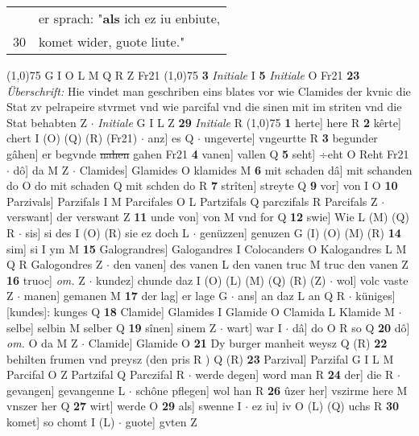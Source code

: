 \documentclass[8pt,a4paper,notitlepage]{article}
\begin{document}
\begin{table}[ht]
\begin{minipage}[t]{0.5\linewidth}
\begin{tabular}{rl}
 & er sprach: "\textbf{als} ich ez iu enbiute,\\ 
30 & komet wider, guote liute."\\ 
\end{tabular}
\scriptsize
\line(1,0){75} \newline
G I O L M Q R Z Fr21 \newline
\line(1,0){75} \newline
\textbf{3} \textit{Initiale} I  \textbf{5} \textit{Initiale} O Fr21  \textbf{23} \textit{Überschrift:} Hie vindet man geschriben eins blates vor wie Clamides der kvnic die Stat zv pelrapeire stvrmet vnd wie parcifal vnd die sinen mit im striten vnd die Stat behabten Z   $\cdot$ \textit{Initiale} G I L Z  \textbf{29} \textit{Initiale} R  \newline
\line(1,0){75} \newline
\textbf{1} herte] here R \textbf{2} kêrte] chert I (O) (Q) (R) (Fr21)  $\cdot$ anz] es Q  $\cdot$ ungeverte] vngeurtte R \textbf{3} begunder gâhen] er begvnde \sout{nahen} gahen Fr21 \textbf{4} vanen] vallen Q \textbf{5} seht] ÷eht O Reht Fr21  $\cdot$ dô] da M Z  $\cdot$ Clamides] Glamides O klamides M \textbf{6} mit schaden dâ] mit schanden do O do mit schaden Q mit schden do R \textbf{7} strîten] streyte Q \textbf{9} vor] von I O \textbf{10} Parzivals] Parzifals I M Parcifales O L Partzifals Q parczifals R Parcifals Z  $\cdot$ verswant] der verswant Z \textbf{11} unde von] von M vnd for Q \textbf{12} swie] Wie L (M) (Q) R  $\cdot$ sis] si des I (O) (R) sie ez doch L  $\cdot$ genüzzen] genuzen G (I) (O) (M) (R) \textbf{14} sim] si I ym M \textbf{15} Galograndres] Galogandres I Colocanders O Kalogandres L M Q R Galogondres Z  $\cdot$ den vanen] des vanen L den vanen truc M truc den vanen Z \textbf{16} truoc] \textit{om.} Z  $\cdot$ kundez] chunde daz I (O) (L) (M) (Q) (R) (Z)  $\cdot$ wol] volc vaste Z  $\cdot$ manen] gemanen M \textbf{17} der lag] er lage G  $\cdot$ ans] an daz L an Q R  $\cdot$ küniges] [kundes]: kunges Q \textbf{18} Clamide] Glamides I Glamide O Clamida L Klamide M  $\cdot$ selbe] selbin M selber Q \textbf{19} sînen] sinem Z  $\cdot$ wart] war I  $\cdot$ dâ] do O R so Q \textbf{20} dô] \textit{om.} O da M Z  $\cdot$ Clamide] Glamide O \textbf{21} Dy burger manheit weysz Q (R) \textbf{22} behilten frumen vnd preysz (den pris R ) Q (R) \textbf{23} Parzival] Parzifal G I L M Parcifal O Z Partzifal Q Parczifal R  $\cdot$ werde degen] word man R \textbf{24} der] die R  $\cdot$ gevangen] gevangenne L  $\cdot$ schône pflegen] wol han R \textbf{26} ûzer her] vszirme here M vnszer her Q \textbf{27} wirt] werde O \textbf{29} als] swenne I  $\cdot$ ez iu] iv O (L) (Q) uchs R \textbf{30} komet] so chomt I (L)  $\cdot$ guote] gvten Z \newline

\end{minipage}
\end{table}
\end{document}
